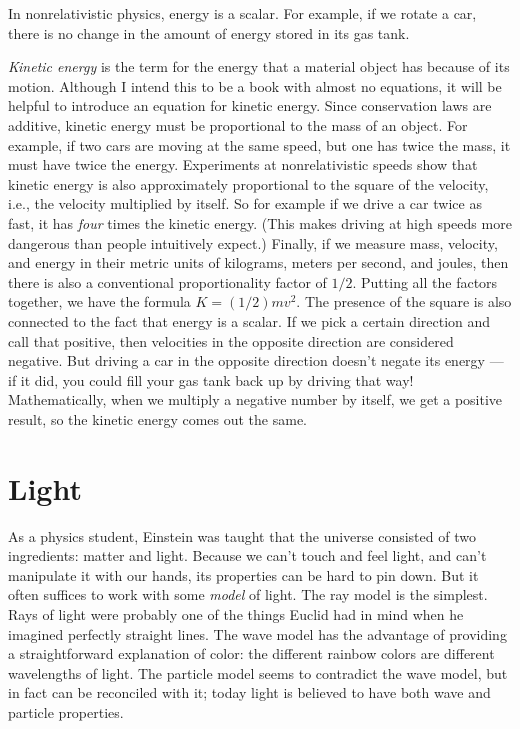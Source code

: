 In nonrelativistic physics, energy is a scalar. For example, if we rotate a car, there is no change
in the amount of energy stored in its gas tank.

\emph{Kinetic energy} is the term for the
energy that a material object has because of its motion.
Although I intend this to be a book with almost no equations, it will be helpful to introduce an
equation for kinetic energy. Since conservation laws are additive, kinetic energy must be proportional
to the mass of an object. For example, if two cars are moving at the same speed, but one has twice the
mass, it must have twice the energy. Experiments at nonrelativistic speeds show that kinetic energy is
also approximately proportional to the square of the velocity, i.e., the velocity multiplied by itself.
So for example if we drive a car twice as fast, it has \emph{four} times the kinetic energy.
(This makes driving at high speeds more dangerous than people intuitively expect.) Finally, if we measure
mass, velocity, and energy in their metric units of kilograms, meters per second, and joules, then
there is also a conventional proportionality factor of $1/2$. Putting all the factors together, we have
the formula $K=(1/2)mv^2$.\label{ke-formula}
The presence of the square is also connected to the fact that energy is a scalar.
If we pick a certain direction and call that positive, then velocities in the opposite direction are considered
negative. But driving a car in the opposite direction doesn't negate its energy --- if it did, you could fill your
gas tank back up by driving that way! Mathematically, when we multiply a negative number by itself, we get a
positive result, so the kinetic energy comes out the same.

\section{Light}

As a physics student, Einstein was taught that the universe consisted of two ingredients: matter and light.
Because we can't touch and feel light, and can't manipulate it with our hands, its properties can be hard to
pin down. But it often suffices to work with some \emph{model} of light. The ray model is the simplest. Rays
of light were probably one of the things Euclid had in mind when he imagined perfectly straight lines.
The wave model has the advantage of providing a straightforward explanation of color: the different rainbow
colors are different wavelengths of light. The particle model seems to contradict the wave model, but in fact
can be reconciled with it; today light is believed to have both wave and particle properties.

